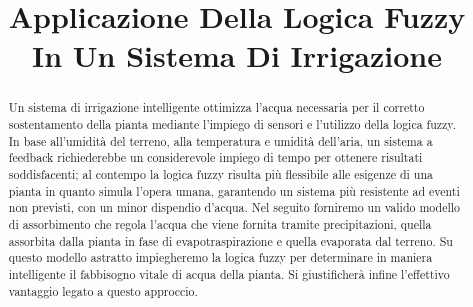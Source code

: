 \documentclass[conference,10pt]{IEEEtran}
\begin{document}




\title{Applicazione Della Logica Fuzzy\\ In Un Sistema Di Irrigazione}

\author{
}

\maketitle
\thispagestyle{empty}
\pagestyle{plain}



\begin{abstract}
Un sistema di irrigazione intelligente ottimizza l'acqua necessaria per il corretto sostentamento della pianta mediante l'impiego di sensori e l'utilizzo della logica fuzzy.
In base all'umidità del terreno,  alla temperatura e umidità dell'aria, un sistema a feedback richiederebbe un considerevole impiego di tempo per ottenere risultati soddisfacenti; al contempo la logica fuzzy risulta più flessibile alle esigenze di una pianta in quanto simula l'opera umana, garantendo un sistema più resistente ad eventi non previsti, con un minor dispendio d'acqua. Nel seguito forniremo un valido modello di assorbimento che regola  l'acqua che viene fornita tramite precipitazioni, quella assorbita dalla pianta in fase di evapotraspirazione e quella evaporata dal terreno. Su questo modello astratto impiegheremo la logica fuzzy per determinare in maniera intelligente il fabbisogno vitale di acqua della pianta. Si giustificherà infine l'effettivo vantaggio legato a questo approccio.
\end{abstract}

\end{document}
